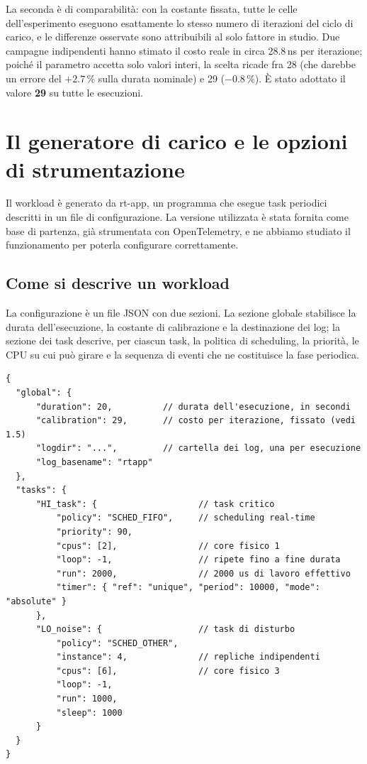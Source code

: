 \documentclass[11pt,a4paper]{article}
\begin{document}
La seconda \`e di comparabilit\`a: con la costante fissata, tutte le celle dell'esperimento
eseguono esattamente lo stesso numero di iterazioni del ciclo di carico, e le differenze osservate
sono attribuibili al solo fattore in studio. Due campagne indipendenti hanno stimato il costo reale
in circa 28.8\,ns per iterazione; poich\'e il parametro accetta solo valori interi, la scelta
ricade fra 28 (che darebbe un errore del $+2.7$\,\% sulla durata nominale) e 29 ($-0.8$\,\%). \`E
stato adottato il valore \textbf{29} su tutte le esecuzioni.

\section{Il generatore di carico e le opzioni di strumentazione}

Il workload \`e generato da rt-app, un programma che esegue task periodici descritti in un file di
configurazione. La versione utilizzata \`e stata fornita come base di partenza, gi\`a strumentata
con OpenTelemetry, e ne abbiamo studiato il funzionamento per poterla configurare correttamente.

\subsection{Come si descrive un workload}

La configurazione \`e un file JSON con due sezioni. La sezione globale stabilisce la durata
dell'esecuzione, la costante di calibrazione e la destinazione dei log; la sezione dei task
descrive, per ciascun task, la politica di scheduling, la priorit\`a, le CPU su cui pu\`o girare e
la sequenza di eventi che ne costituisce la fase periodica.

\begin{lstlisting}[caption={Struttura della configurazione: un task critico e un task di disturbo.}]
{
  "global": {
      "duration": 20,          // durata dell'esecuzione, in secondi
      "calibration": 29,       // costo per iterazione, fissato (vedi 1.5)
      "logdir": "...",         // cartella dei log, una per esecuzione
      "log_basename": "rtapp"
  },
  "tasks": {
      "HI_task": {                    // task critico
          "policy": "SCHED_FIFO",     // scheduling real-time
          "priority": 90,
          "cpus": [2],                // core fisico 1
          "loop": -1,                 // ripete fino a fine durata
          "run": 2000,                // 2000 us di lavoro effettivo
          "timer": { "ref": "unique", "period": 10000, "mode": "absolute" }
      },
      "LO_noise": {                   // task di disturbo
          "policy": "SCHED_OTHER",
          "instance": 4,              // repliche indipendenti
          "cpus": [6],                // core fisico 3
          "loop": -1,
          "run": 1000,
          "sleep": 1000
      }
  }
}
\end{lstlisting}
\end{document}
